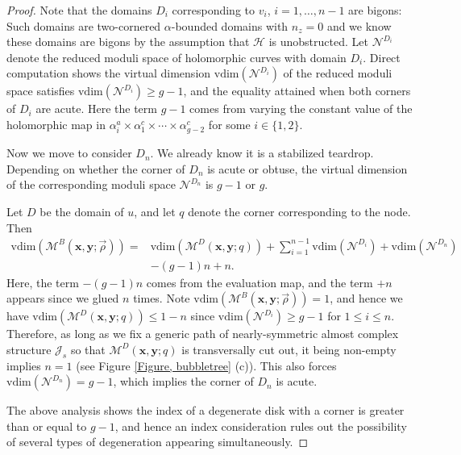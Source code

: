 \documentclass{amsart}
\theoremstyle{definition}
\theoremstyle{remark}
\numberwithin{equation}{section}
\numberwithin{equation}{section} \makeatletter
\begin{document}
\begin{proof}
Note that the domains $D_i$ corresponding to $v_i$, $i=1,\ldots,n-1$ are bigons: Such domains are two-cornered $\alpha$-bounded domains with $n_z=0$ and we know these domains are bigons by the assumption that $\mathcal{H}$ is unobstructed. Let $\mathcal{N}^{D_i}$ denote the reduced moduli space of holomorphic curves with domain $D_i$. Direct computation shows the virtual dimension $\text{vdim}(\mathcal{N}^{D_i})$ of the reduced moduli space satisfies $\text{vdim}(\mathcal{N}^{D_i})\geq g-1$, and the equality attained when both corners of $D_i$ are acute. Here the term $g-1$ comes from varying the constant value of the holomorphic map in $\alpha_i^a\times \alpha_1^c \times \cdots \times \alpha^{c}_{g-2}$ for some $i\in\{1,2\}$.

Now we move to consider $D_n$. We already know it is a stabilized teardrop. Depending on whether the corner of $D_n$ is acute or obtuse, the virtual dimension of the corresponding moduli space $\mathcal{N}^{D_n}$ is $g-1$ or $g$.

Let $D$ be the domain of $u$, and let $q$ denote the corner corresponding to the node. Then $$
\begin{aligned}
\text{vdim}({\mathcal{M}}^B(\bm{x},\bm{y};\overrightarrow{\rho}))=&\text{vdim}({\mathcal{M}}^D(\bm{x},\bm{y};q))+\sum_{i=1}^{n-1}\text{vdim}(\mathcal{N}^{D_i})+\text{vdim}(\mathcal{N}^{D_n})\\&-(g-1)n+n.
\end{aligned}
$$
Here, the term $-(g-1)n$ comes from the evaluation map, and the term $+n$ appears since we glued $n$ times. Note $\text{vdim}({\mathcal{M}}^B(\bm{x},\bm{y};\overrightarrow{\rho}))=1$, and hence we have $\text{vdim}({\mathcal{M}}^D(\bm{x},\bm{y};q))\leq 1-n$ since $\text{vdim}(\mathcal{N}^{D_i})\geq g-1$ for $1\leq i\leq n$. Therefore, as long as we fix a generic path of nearly-symmetric almost complex structure $\mathcal{J}_s$ so that $\mathcal{M}^D(\bm{x},\bm{y};q)$ is transversally cut out, it being non-empty implies $n=1$ (see Figure \ref{Figure, bubbletree} (c)). This also forces $\text{vdim}(\mathcal{N}^{D_n})=g-1$, which implies the corner of $D_n$ is acute. 

The above analysis shows the index of a degenerate disk with a corner is greater than or equal to $g-1$, and hence an index consideration rules out the possibility of several types of degeneration appearing simultaneously.
\end{proof}
\end{document}
